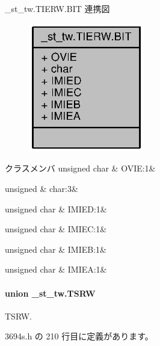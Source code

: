 \+\_\+st\+\_\+tw.\+T\+I\+E\+R\+W.\+B\+I\+T 連携図
\nopagebreak
\begin{figure}[H]
\begin{center}
\leavevmode
\includegraphics[width=143pt]{d1/df8/struct__st__tw_8TIERW_8BIT__coll__graph}
\end{center}
\end{figure}
\begin{DoxyFields}{クラスメンバ}
unsigned char\label{3694s_8h_aa7afa262de6b4b0558b9e572e0f886a3}
&
O\+V\+I\+E\+:1&
\\
\hline

unsigned\label{3694s_8h_aa87deb01c5f539e6bda34829c8ef2368}
&
char\+:3&
\\
\hline

unsigned char\label{3694s_8h_a51be2f3c85702ac61a9a00a3646ede85}
&
I\+M\+I\+E\+D\+:1&
\\
\hline

unsigned char\label{3694s_8h_a85bb71f4f606a50cd9dcc5ba5eb6a84d}
&
I\+M\+I\+E\+C\+:1&
\\
\hline

unsigned char\label{3694s_8h_a28f280fb1861fc7eb394395fb9919d23}
&
I\+M\+I\+E\+B\+:1&
\\
\hline

unsigned char\label{3694s_8h_a985d5af459292c1c88cb94585350e337}
&
I\+M\+I\+E\+A\+:1&
\\
\hline

\end{DoxyFields}
\label{union__st__tw_8TSRW}
\paragraph{union \+\_\+st\+\_\+tw.\+T\+S\+R\+W}
T\+S\+R\+W. 

 3694s.\+h の 210 行目に定義があります。



